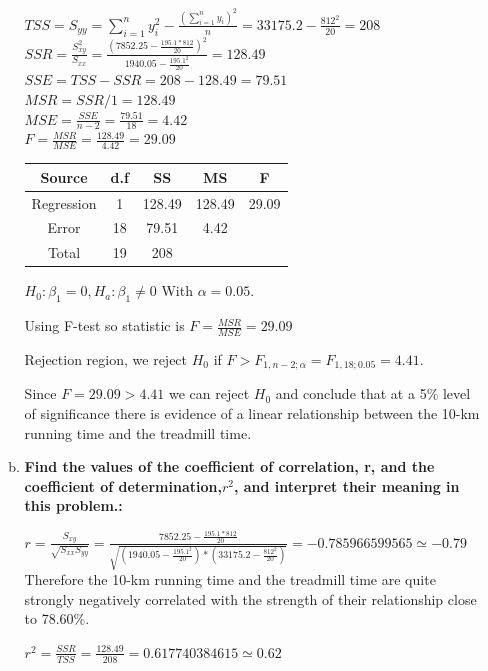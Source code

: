 \documentclass{article}
\begin{document}
\begin{enumerate}[1.]
\begin{enumerate}[(a)]
$TSS = S_{yy} = \sum_{i=1}^{n}{y_i^2} - \frac{ (\sum_{i=1}^{n}{y_i})^2 }{n} = 33175.2 - \frac{812^2}{20} = 208 $ \\
$SSR = \frac{S_{xy}^2}{S_{xx}} = \frac{ (7852.25 - \frac{195.1 * 812}{20})^2}{ 1940.05 - \frac{195.1^2}{20}} = 128.49 $ \\
$SSE = TSS - SSR = 208 - 128.49 = 79.51 $ \\ 
$MSR = SSR/1 = 128.49 $ \\ 
$MSE = \frac{SSE}{n-2} = \frac{79.51}{18} = 4.42$ \\
$F = \frac{MSR}{MSE} = \frac{128.49}{4.42} =  29.09 $ \\

\begin{center}
 \begin{tabular}{||c c c c c||} 
 \hline
Source & d.f & SS & MS & F \\ [0.5ex] 
 \hline\hline
Regression & 1 & 128.49 & 128.49 & 29.09 \\
 \hline
Error & 18 & 79.51 & 4.42 &  \\
 \hline
Total & 19  & 208 & & \\ [1ex]
 \hline
\end{tabular}
\end{center}

$H_0: \beta_1 = 0, H_a: \beta_1 \neq 0$
With $\alpha = 0.05$.

Using F-test so statistic is $F = \frac{MSR}{MSE} = 29.09$

Rejection region, we reject $H_0$ if $F > F_{1,n-2;\alpha} = F_{1,18;0.05} = 4.41$.

Since $F = 29.09 > 4.41$ we can reject $H_0$ and conclude that at a 5\% level of significance there is evidence of a linear relationship between the 10-km running time and the treadmill time. 

  \item \textbf{ Find the values of the coefficient of correlation, r, and the coefficient of determination,$r^2$, and interpret their meaning in this problem.: }

$r = \frac{S_{xy}}{\sqrt{S_{xx}S_{yy}}} = \frac{7852.25-\frac{195.1*812}{20}}{\sqrt{ (1940.05 - \frac{195.1^2}{20}) * (33175.2-\frac{812^2}{20})}} = -0.785966599565 \simeq -0.79$ \\

Therefore the 10-km running time and the treadmill time are quite strongly negatively correlated with the strength of their relationship close to 78.60\%.

$r^2 = \frac{SSR}{TSS} = \frac{128.49}{208} = 0.617740384615 \simeq 0.62$ \\


\end{enumerate}
\end{enumerate}
\end{document}
